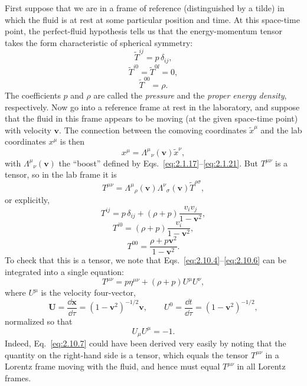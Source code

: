 First suppose that we are in a frame of reference (distinguished by a tilde) in
which the fluid is at rest at some particular position and time. At this
space-time point, the perfect-fluid hypothesis tells us that the energy-momentum
tensor takes the form characteristic of spherical symmetry:
\begin{equation}
  \widetilde T^{ij}=p\,\delta_{ij},
  \tag{2.10.1}\label{eq:2.10.1}
\end{equation}
\begin{equation}
  \widetilde T^{i0}=\widetilde T^{0\ii}=0,
  \tag{2.10.2}\label{eq:2.10.2}
\end{equation}
\begin{equation}
  \widetilde T^{00}=\rho.
  \tag{2.10.3}\label{eq:2.10.3}
\end{equation}
The coefficients \(p\) and \(\rho\) are called the \emph{pressure} and the
\emph{proper energy density}, respectively. Now go into a reference frame at
rest in the laboratory, and suppose that the fluid in this frame appears to be
moving (at the given space-time point) with velocity \(\mathbf v\). The
connection between the comoving coordinates \(\widetilde x^\mu\) and the lab
coordinates \(x^\mu\) is then
\[
  x^\mu=\Lambda^\mu{}_\nu(\mathbf v)\widetilde x^\nu ,
\]
with \(\Lambda^\mu{}_\nu(\mathbf v)\) the ``boost'' defined by
Eqs.~\eqref{eq:2.1.17}--\eqref{eq:2.1.21}. But \(T^{\mu\nu}\) is a tensor,
so in the lab frame it is
\[
  T^{\mu\nu}
  =\Lambda^\mu{}_\rho(\mathbf v)\Lambda^\nu{}_\sigma(\mathbf v)
   \widetilde T^{\rho\sigma},
\]
or explicitly,
\begin{equation}
  T^{ij}=p\,\delta_{ij}
  +(\rho+p)\frac{v_iv_j}{1-\mathbf v^2},
  \tag{2.10.4}\label{eq:2.10.4}
\end{equation}
\begin{equation}
  T^{i0}=(\rho+p)\frac{v_i}{1-\mathbf v^2},
  \tag{2.10.5}\label{eq:2.10.5}
\end{equation}
\begin{equation}
  T^{00}=\frac{\rho+p\mathbf v^2}{1-\mathbf v^2}.
  \tag{2.10.6}\label{eq:2.10.6}
\end{equation}
To check that this is a tensor, we note that
Eqs.~\eqref{eq:2.10.4}--\eqref{eq:2.10.6} can be integrated into a single
equation:
\begin{equation}
  T^{\mu\nu}=p\eta^{\mu\nu}+(\rho+p)U^\mu U^\nu ,
  \tag{2.10.7}\label{eq:2.10.7}
\end{equation}
where \(U^\mu\) is the velocity four-vector,
\begin{equation}
  \mathbf U=\frac{\dd\mathbf x}{\dd\tau}
  =(1-\mathbf v^2)^{-1/2}\mathbf v,\qquad
  U^0=\frac{\dd t}{\dd\tau}=(1-\mathbf v^2)^{-1/2},
  \tag{2.10.8}\label{eq:2.10.8}
\end{equation}
normalized so that
\begin{equation}
  U_\mu U^\mu=-1.
  \tag{2.10.9}\label{eq:2.10.9}
\end{equation}
Indeed, Eq.~\eqref{eq:2.10.7} could have been derived very easily by noting
that the quantity on the right-hand side is a tensor, which equals the tensor
\(T^{\mu\nu}\) in a Lorentz frame moving with the fluid, and hence must equal
\(T^{\mu\nu}\) in all Lorentz frames.

